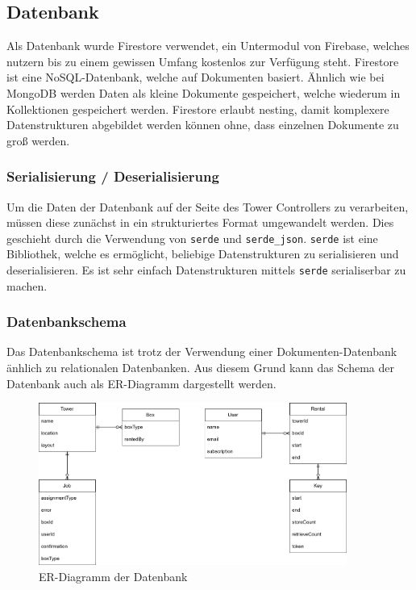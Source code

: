 \subsection{Datenbank}

Als Datenbank wurde Firestore verwendet, ein Untermodul von Firebase, welches nutzern bis zu einem gewissen Umfang kostenlos zur Verfügung steht. Firestore ist eine NoSQL-Datenbank, welche auf Dokumenten basiert. Ähnlich wie bei MongoDB werden Daten als kleine Dokumente gespeichert, welche wiederum in Kollektionen gespeichert werden. Firestore erlaubt nesting, damit komplexere Datenstrukturen abgebildet werden können ohne, dass einzelnen Dokumente zu groß werden.


\subsubsection{Serialisierung / Deserialisierung}

Um die Daten der Datenbank auf der Seite des Tower Controllers zu verarbeiten, müssen diese zunächst in ein strukturiertes Format umgewandelt werden. Dies geschieht durch die Verwendung von \texttt{serde} und \texttt{serde\_json}. \texttt{serde} ist eine Bibliothek, welche es ermöglicht, beliebige Datenstrukturen zu serialisieren und deserialisieren. Es ist sehr einfach Datenstrukturen mittels \texttt{serde} serialiserbar zu machen.


\subsubsection{Datenbankschema}
Das Datenbankschema ist trotz der Verwendung einer Dokumenten-Datenbank änhlich zu relationalen Datenbanken. Aus diesem Grund kann das Schema der Datenbank auch als ER-Diagramm dargestellt werden.

\begin{figure}[ht]
    \centering
    \includegraphics[width=0.9\textwidth]{images/datenbankstruktur.png}
    \caption{ER-Diagramm der Datenbank}
    \label{fig:er_diagramm}
\end{figure}


